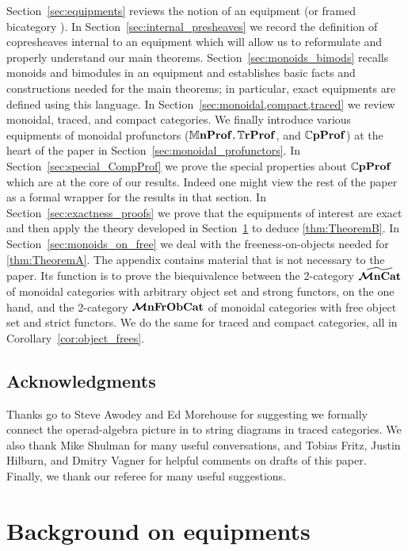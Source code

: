 \documentclass[11pt,oneside,article]{memoir}
\begin{document}
Section~\ref{sec:equipments} reviews the notion of an equipment (or framed bicategory \cite{Shulman}).  In Section~\ref{sec:internal_presheaves} we record the definition of copresheaves internal to an equipment which will allow us to reformulate and properly understand our main theorems. Section~\ref{sec:monoids_bimods} recalls monoids and bimodules in an equipment and establishes basic facts and constructions needed for the main theorems; in particular, exact equipments \cite{Schultz2015} are defined using this language.  In Section~\ref{sec:monoidal,compact,traced} we review monoidal, traced, and compact categories. We finally introduce various equipments of monoidal profunctors ($\mathbb{M}\mathbf{nProf}, \mathbb{T}\mathbf{rProf}$, and $\mathbb{C}\mathbf{pProf}$) at the heart of the paper in Section~\ref{sec:monoidal_profunctors}.   In Section~\ref{sec:special_CompProf} we prove the special properties about $\mathbb{C}\mathbf{pProf}$ which are at the core of our results.  Indeed one might view the rest of the paper as a formal wrapper for the results in that section.  In Section~\ref{sec:exactness_proofs} we prove that the equipments of interest are exact and then apply the theory developed in Section~\ref{chap:background_equipments} to deduce \ref{thm:TheoremB}.  In Section~\ref{sec:monoids_on_free} we deal with the freeness-on-objects needed for \ref{thm:TheoremA}. The appendix contains material that is not necessary to the paper. Its function is to prove the biequivalence between the 2-category $\widetilde{\bm{\mathcal{M}}\mathbf{nCat}}$ of monoidal categories with arbitrary object set and strong functors, on the one hand, and the 2-category $\bm{\mathcal{M}}\mathbf{nFrObCat}$ of monoidal categories with free object set and strict functors. We do the same for traced and compact categories, all in Corollary~\ref{cor:object_frees}.

\section*{Acknowledgments}

Thanks go to Steve Awodey and Ed Morehouse for suggesting we formally connect the operad-algebra
picture in \cite{RupelSpivak} to string diagrams in traced categories. We also thank Mike Shulman
for many useful conversations, and Tobias Fritz, Justin Hilburn, and Dmitry Vagner for helpful
comments on drafts of this paper. Finally, we thank our referee for many useful suggestions.


\chapter{Background on equipments}
      \label{chap:background_equipments}
\end{document}
